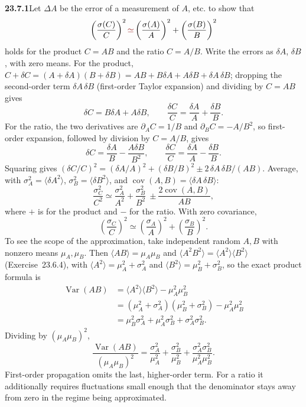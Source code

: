 \par\bigskip
\noindent\textbf{23.7.1}\quad Let $\Delta A$ be the error of a
measurement of $A$, etc.  to show that
\[
\left(\frac{\sigma(C)}{C}\right)^{2}
\erratum{\simeq}\left(\frac{\sigma(A)}{A}\right)^{2}
+\left(\frac{\sigma(B)}{B}\right)^{2}
\]
holds for the product $C=AB$ and the ratio $C=A/B$.
\solution
{}
Write the errors as $\delta A$, $\delta B$, with zero means. For the
product, $C+\delta C=(A+\delta A)(B+\delta B)
=AB+B\delta A+A\delta B+\delta A\,\delta B$; dropping the second-order
term $\delta A\,\delta B$ (first-order Taylor expansion) and dividing by
$C=AB$ gives
\[
\delta C=B\delta A+A\delta B,
\qquad\frac{\delta C}{C}=\frac{\delta A}{A}+\frac{\delta B}{B}.
\]
For the ratio, the two derivatives are $\partial_AC=1/B$ and
$\partial_BC=-A/B^2$, so first-order expansion, followed by division
by $C=A/B$, gives
\[
\delta C=\frac{\delta A}{B}-\frac{A\delta B}{B^2},
\qquad\frac{\delta C}{C}=\frac{\delta A}{A}-\frac{\delta B}{B}.
\]
Squaring gives
$(\delta C/C)^2=(\delta A/A)^2+(\delta B/B)^2\pm2\,\delta A\,\delta B/(AB)$.
Average, with $\sigma_A^2=\langle\delta A^2\rangle$,
$\sigma_B^2=\langle\delta B^2\rangle$, and
$\operatorname{cov}(A,B)=\langle\delta A\,\delta B\rangle$:
\[
\frac{\sigma_C^2}{C^2}\simeq
\frac{\sigma_A^2}{A^2}+\frac{\sigma_B^2}{B^2}
\ \mathbin{\pm}\frac{2\operatorname{cov}(A,B)}{AB},
\]
where $+$ is for the product and $-$ for the ratio. With zero covariance,
\[
\boxed{\left(\frac{\sigma_C}{C}\right)^2\simeq
\left(\frac{\sigma_A}{A}\right)^2+
\left(\frac{\sigma_B}{B}\right)^2}.
\]
To see the scope of the approximation, take independent random $A,B$
with nonzero means $\mu_A,\mu_B$. Then $\langle AB\rangle=\mu_A\mu_B$ and
$\langle A^2B^2\rangle=\langle A^2\rangle\langle B^2\rangle$
(Exercise~23.6.4), with $\langle A^2\rangle=\mu_A^2+\sigma_A^2$ and
$\langle B^2\rangle=\mu_B^2+\sigma_B^2$, so the exact product formula is
\begin{align*}
\operatorname{Var}(AB)
&=\langle A^2\rangle\langle B^2\rangle-\mu_A^2\mu_B^2\\
&=(\mu_A^2+\sigma_A^2)(\mu_B^2+\sigma_B^2)-\mu_A^2\mu_B^2\\
&=\mu_B^2\sigma_A^2+\mu_A^2\sigma_B^2+\sigma_A^2\sigma_B^2.
\end{align*}
Dividing by $(\mu_A\mu_B)^2$,
\[
\frac{\operatorname{Var}(AB)}{(\mu_A\mu_B)^2}
=\frac{\sigma_A^2}{\mu_A^2}+\frac{\sigma_B^2}{\mu_B^2}
+\frac{\sigma_A^2\sigma_B^2}{\mu_A^2\mu_B^2}.
\]
First-order propagation omits the last, higher-order term.
For a ratio it additionally requires fluctuations small enough that
the denominator stays away from zero in the regime being approximated.


